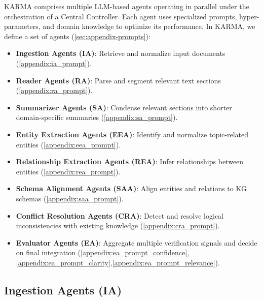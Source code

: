 \documentclass{article}
\begin{document}
KARMA comprises multiple LLM-based agents operating in parallel under the orchestration of a Central Controller. Each agent uses specialized prompts, hyper-parameters, and domain knowledge to optimize its performance. In KARMA, we define a set of agents (\ref{sec:appendix-prompts}):
\begin{itemize}[leftmargin=0em, labelsep=0.5em]
    \item \textbf{Ingestion Agents (IA)}: Retrieve and normalize input documents (\ref{appendix:ia_prompt}).
    \item \textbf{Reader Agents (RA)}: Parse and segment relevant text sections (\ref{appendix:ra_prompt}).
    \item \textbf{Summarizer Agents (SA)}: Condense relevant sections into shorter domain-specific summaries (\ref{appendix:sa_prompt}).
    \item \textbf{Entity Extraction Agents (EEA)}: Identify and normalize topic-related entities (\ref{appendix:eea_prompt}).
    \item \textbf{Relationship Extraction Agents (REA)}: Infer relationships between entities (\ref{appendix:rea_prompt}).
    \item \textbf{Schema Alignment Agents (SAA)}: Align entities and relations to KG schemas (\ref{appendix:saa_prompt}).
    \item \textbf{Conflict Resolution Agents (CRA)}: Detect and resolve logical inconsistencies with existing knowledge (\ref{appendix:cra_prompt}).
    \item \textbf{Evaluator Agents (EA)}: Aggregate multiple verification signals and decide on final integration (\ref{appendix:ea_prompt_confidence},\ref{appendix:ea_prompt_clarity},\ref{appendix:ea_prompt_relevance}).
\end{itemize}


\subsection{Ingestion Agents (IA)}
\end{document}
